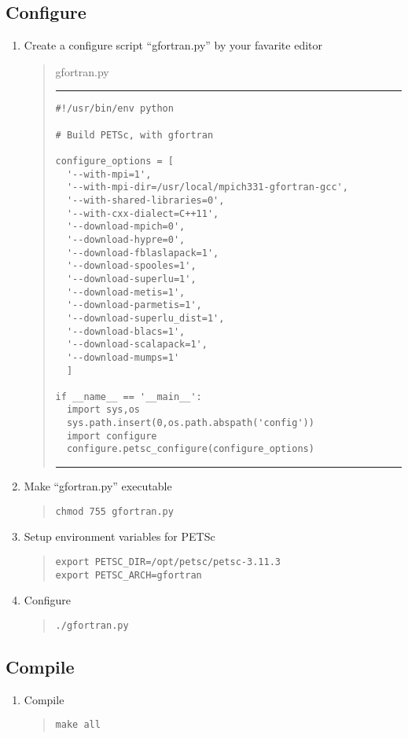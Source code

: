 \documentclass[11pt]{article}
\begin{document}
\subsection{Configure}
\begin{enumerate}
\item
Create a configure script ``gfortran.py'' by your favarite editor
\begin{quote}
gfortran.py
\hrule
\begin{verbatim}
#!/usr/bin/env python

# Build PETSc, with gfortran

configure_options = [
  '--with-mpi=1',
  '--with-mpi-dir=/usr/local/mpich331-gfortran-gcc',
  '--with-shared-libraries=0',
  '--with-cxx-dialect=C++11',
  '--download-mpich=0',
  '--download-hypre=0',
  '--download-fblaslapack=1',
  '--download-spooles=1',
  '--download-superlu=1',
  '--download-metis=1',
  '--download-parmetis=1',
  '--download-superlu_dist=1',
  '--download-blacs=1',
  '--download-scalapack=1',
  '--download-mumps=1'
  ]

if __name__ == '__main__':
  import sys,os
  sys.path.insert(0,os.path.abspath('config'))
  import configure
  configure.petsc_configure(configure_options)
\end{verbatim}
\hrule
\end{quote}
\item
Make ``gfortran.py'' executable
\begin{quote}
\begin{verbatim}
chmod 755 gfortran.py
\end{verbatim}
\end{quote}
\item
Setup environment variables for PETSc
\begin{quote}
\begin{verbatim}
export PETSC_DIR=/opt/petsc/petsc-3.11.3
export PETSC_ARCH=gfortran
\end{verbatim}
\end{quote}
\item
Configure
\begin{quote}
\begin{verbatim}
./gfortran.py
\end{verbatim}
\end{quote}
\end{enumerate}

\subsection{Compile}
\begin{enumerate}
\item
Compile
\begin{quote}
\begin{verbatim}
make all
\end{verbatim}
\end{quote}
\end{enumerate}
\end{document}
